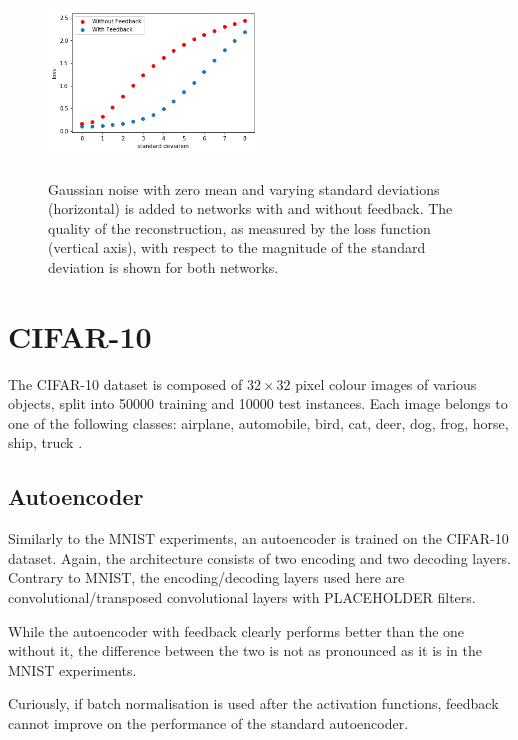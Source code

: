 \documentclass{article}
\begin{document}
  \begin{figure}
      \centering
      \includegraphics[width=0.5\textwidth,height=5cm,keepaspectratio]{img/actnoise_varstd.png}
      \caption{Gaussian noise with zero mean and varying standard deviations (horizontal) is added to networks with and without feedback. The quality of the reconstruction, as measured by the loss function (vertical axis), with respect to the magnitude of the standard deviation is shown for both networks. }
      \label{fig:noiseact}
  \end{figure}

  
\section{CIFAR-10}
The CIFAR-10 dataset is composed of $32\times32$ pixel colour images of various objects, split into 50000 training and 10000 test instances. Each image belongs to one of the following classes: airplane, automobile, bird, cat, deer, dog, frog, horse, ship, truck \cite{krizhevsky2014cifar}. 

\subsection{Autoencoder}
Similarly to the MNIST experiments, an autoencoder is trained on the CIFAR-10 dataset. Again, the architecture consists of two encoding and two decoding layers. Contrary to MNIST, the encoding/decoding layers used here are convolutional/transposed convolutional layers with PLACEHOLDER filters. 

While the autoencoder with feedback clearly performs better than the one without it, the difference between the two is not as pronounced as it is in the MNIST experiments.   

Curiously, if batch normalisation is used after the activation functions, feedback cannot improve on the performance of the standard autoencoder. 
\end{document}
